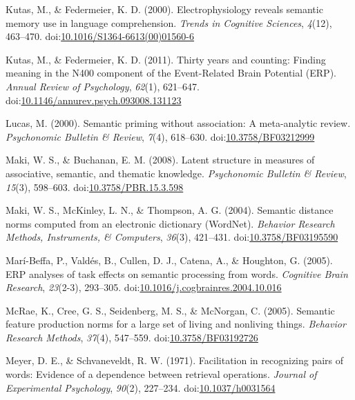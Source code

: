 \documentclass[english,man]{apa6}
\theoremstyle{definition}
\theoremstyle{definition}
\theoremstyle{definition}
\theoremstyle{remark}
\begin{document}
\hypertarget{ref-Kutas2000}{}
Kutas, M., \& Federmeier, K. D. (2000). Electrophysiology reveals
semantic memory use in language comprehension. \emph{Trends in Cognitive
Sciences}, \emph{4}(12), 463--470.
doi:\href{https://doi.org/10.1016/S1364-6613(00)01560-6}{10.1016/S1364-6613(00)01560-6}

\hypertarget{ref-Kutas2011}{}
Kutas, M., \& Federmeier, K. D. (2011). Thirty years and counting:
Finding meaning in the N400 component of the Event-Related Brain
Potential (ERP). \emph{Annual Review of Psychology}, \emph{62}(1),
621--647.
doi:\href{https://doi.org/10.1146/annurev.psych.093008.131123}{10.1146/annurev.psych.093008.131123}

\hypertarget{ref-Lucas2000}{}
Lucas, M. (2000). Semantic priming without association: A meta-analytic
review. \emph{Psychonomic Bulletin \& Review}, \emph{7}(4), 618--630.
doi:\href{https://doi.org/10.3758/BF03212999}{10.3758/BF03212999}

\hypertarget{ref-Maki2008}{}
Maki, W. S., \& Buchanan, E. M. (2008). Latent structure in measures of
associative, semantic, and thematic knowledge. \emph{Psychonomic
Bulletin \& Review}, \emph{15}(3), 598--603.
doi:\href{https://doi.org/10.3758/PBR.15.3.598}{10.3758/PBR.15.3.598}

\hypertarget{ref-Maki2004}{}
Maki, W. S., McKinley, L. N., \& Thompson, A. G. (2004). Semantic
distance norms computed from an electronic dictionary (WordNet).
\emph{Behavior Research Methods, Instruments, \& Computers},
\emph{36}(3), 421--431.
doi:\href{https://doi.org/10.3758/BF03195590}{10.3758/BF03195590}

\hypertarget{ref-Mari-Beffa2005}{}
Marí-Beffa, P., Valdés, B., Cullen, D. J., Catena, A., \& Houghton, G.
(2005). ERP analyses of task effects on semantic processing from words.
\emph{Cognitive Brain Research}, \emph{23}(2-3), 293--305.
doi:\href{https://doi.org/10.1016/j.cogbrainres.2004.10.016}{10.1016/j.cogbrainres.2004.10.016}

\hypertarget{ref-McRae2005}{}
McRae, K., Cree, G. S., Seidenberg, M. S., \& McNorgan, C. (2005).
Semantic feature production norms for a large set of living and
nonliving things. \emph{Behavior Research Methods}, \emph{37}(4),
547--559.
doi:\href{https://doi.org/10.3758/BF03192726}{10.3758/BF03192726}

\hypertarget{ref-Meyer1971}{}
Meyer, D. E., \& Schvaneveldt, R. W. (1971). Facilitation in recognizing
pairs of words: Evidence of a dependence between retrieval operations.
\emph{Journal of Experimental Psychology}, \emph{90}(2), 227--234.
doi:\href{https://doi.org/10.1037/h0031564}{10.1037/h0031564}
\end{document}
